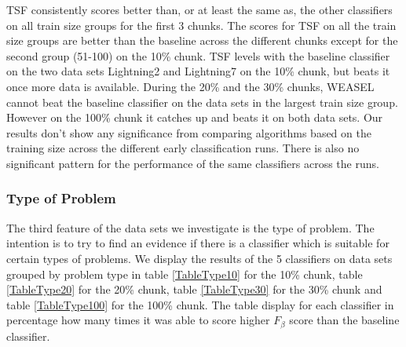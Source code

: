 TSF consistently scores better than, or at least the same as, the other classifiers on all train size groups for the first 3 chunks.
The scores for TSF on all the train size groups are better than the baseline across the different chunks except for the second group (51-100) on the 10\% chunk.
TSF levels with the baseline classifier on the two data sets Lightning2 and Lightning7 on the 10\% chunk, but beats it once more data is available.
During the 20\% and the 30\% chunks, WEASEL cannot beat the baseline classifier on the data sets in the largest train size group.
However on the 100\% chunk it catches up and beats it on both data sets.
Our results don't show any significance from comparing algorithms based on the training size across the different early classification runs.
There is also no significant pattern for the performance of the same classifiers across the runs.


\subsubsection{Type of Problem}
The third feature of the data sets we investigate is the type of problem.
The intention is to try to find an evidence if there is a classifier which is suitable for certain types of problems.
We display the results of the 5 classifiers on data sets grouped by problem type in table \ref{TableType10} for the 10\% chunk, table \ref{TableType20} for the 20\% chunk, table \ref{TableType30} for the 30\% chunk and table \ref{TableType100} for the 100\% chunk.
The table display for each classifier in percentage how many times it was able to score higher $F_{\beta}$ score than the baseline classifier.


